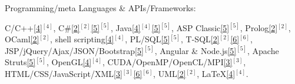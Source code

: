 \begin{cventries}

\vspace{-0.25cm}

  \cventry
    {Programming/meta Languages \& APIs/Frameworks:} %
    {} %
    {} %
    {} %
    {
      \vspace{0.1cm}     
      \begin{cvitems} %
        \item[] {
		\textcolor{rainbowcolor-indigo}{C/C++\ref{4}{$^{[4]}$}},
		\textcolor{rainbowcolor-indigo}{C\#\ref{2}{$^{[2]}$}\ref{5}{$^{[5]}$}},
		\textcolor{rainbowcolor-indigo}{Java\ref{4}{$^{[4]}$}\ref{5}{$^{[5]}$}},
		\textcolor{rainbowcolor-indigo}{ASP Classic\ref{5}{$^{[5]}$}},
		\textcolor{rainbowcolor-indigo}{Prolog\ref{2}{$^{[2]}$}},
		\textcolor{rainbowcolor-indigo}{OCaml\ref{2}{$^{[2]}$}},
		\textcolor{rainbowcolor-indigo}{shell scripting\ref{4}{$^{[4]}$}},
		\textcolor{rainbowcolor-indigo}{PL/SQL\ref{5}{$^{[5]}$}},
		\textcolor{rainbowcolor-indigo}{T-SQL\ref{2}{$^{[2]}$}\ref{6}{$^{[6]}$}},
		\textcolor{rainbowcolor-indigo}{JSP/jQuery/Ajax/JSON/Bootstrap\ref{5}{$^{[5]}$}},
		\textcolor{rainbowcolor-indigo}{Angular %
	    	\& Node.js\ref{5}{$^{[5]}$}},
	    \textcolor{rainbowcolor-indigo}{Apache Struts\ref{5}{$^{[5]}$}},
	    \textcolor{rainbowcolor-indigo}{OpenGL\ref{4}{$^{[4]}$}},
	    \textcolor{rainbowcolor-indigo}{CUDA/OpenMP/OpenCL/MPI\ref{3}{$^{[3]}$}},
	    \textcolor{rainbowcolor-indigo}{HTML/CSS/JavaScript/XML\ref{3}{$^{[3]}$}\ref{6}{$^{[6]}$}},
	    \textcolor{rainbowcolor-indigo}{UML\ref{2}{$^{[2]}$}},
	    \textcolor{rainbowcolor-indigo}{LaTeX\ref{4}{$^{[4]}$}}.%
	    }
	  \end{cvitems}
    }  


\end{cventries}
